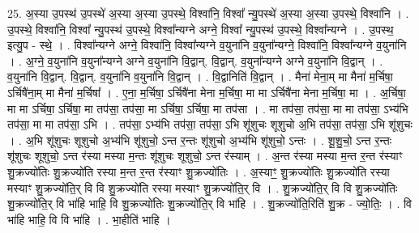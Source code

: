 \documentclass[17pt]{extarticle}
\begin{document}
25. अ॒स्या उ॒पस्थ॑ उ॒पस्थे॑ अ॒स्या अ॒स्या उ॒पस्थे॒ विश्वा॑नि॒ विश्वा᳚ न्यु॒पस्थे॑ अ॒स्या अ॒स्या उ॒पस्थे॒ विश्वा॑नि । . उ॒पस्थे॒ विश्वा॑नि॒ विश्वा᳚ न्यु॒पस्थ॑ उ॒पस्थे॒ विश्वा᳚न्यग्ने अग्ने॒ विश्वा᳚ न्यु॒पस्थ॑ उ॒पस्थे॒ विश्वा᳚न्यग्ने । . उ॒पस्थ॒ इत्यु॒प - स्थे॒ । . विश्वा᳚न्यग्ने अग्ने॒ विश्वा॑नि॒ विश्वा᳚न्यग्ने व॒युना॑नि व॒युना᳚न्यग्ने॒ विश्वा॑नि॒ विश्वा᳚न्यग्ने व॒युना॑नि । . अ॒ग्ने॒ व॒युना॑नि व॒युना᳚न्यग्ने अग्ने व॒युना॑नि वि॒द्वान्. वि॒द्वान्. व॒युना᳚न्यग्ने अग्ने व॒युना॑नि वि॒द्वान् । . व॒युना॑नि वि॒द्वान्. वि॒द्वान्. व॒युना॑नि व॒युना॑नि वि॒द्वान् । . वि॒द्वानिति॑ वि॒द्वान् । . मैना॑ मेना॒म् मा मैना॑ म॒र्चिषा॒ ऽर्चिषै॑ना॒म् मा मैना॑ म॒र्चिषा᳚ । . ए॒ना॒ म॒र्चिषा॒ ऽर्चिषै॑ना मेना म॒र्चिषा॒ मा मा ऽर्चिषै॑ना मेना म॒र्चिषा॒ मा । . अ॒र्चिषा॒ मा मा ऽर्चिषा॒ ऽर्चिषा॒ मा तप॑सा॒ तप॑सा॒ मा ऽर्चिषा॒ ऽर्चिषा॒ मा तप॑सा । . मा तप॑सा॒ तप॑सा॒ मा मा तप॑सा॒ ऽभ्य॑भि तप॑सा॒ मा मा तप॑सा॒ ऽभि । . तप॑सा॒ ऽभ्य॑भि तप॑सा॒ तप॑सा॒ ऽभि शू॑शुचः शूशुचो अ॒भि तप॑सा॒ तप॑सा॒ ऽभि शू॑शुचः । . अ॒भि शू॑शुचः शूशुचो अ॒भ्य॑भि शू॑शुचो॒ ऽन्त र॒न्तः शू॑शुचो अ॒भ्य॑भि शू॑शुचो॒ ऽन्तः । . शू॒शु॒चो॒ ऽन्त र॒न्तः शू॑शुचः शूशुचो॒ ऽन्त र॑स्या मस्या म॒न्तः शू॑शुचः शूशुचो॒ ऽन्त र॑स्याम् । . अ॒न्त र॑स्या मस्या म॒न्त र॒न्त र॑स्याꣳ शु॒क्रज्यो॑तिः शु॒क्रज्यो॑ति रस्या म॒न्त र॒न्त र॑स्याꣳ शु॒क्रज्यो॑तिः । . अ॒स्याꣳ॒॒ शु॒क्रज्यो॑तिः शु॒क्रज्यो॑ति रस्या मस्याꣳ शु॒क्रज्यो॑ति॒र् वि वि शु॒क्रज्यो॑ति रस्या मस्याꣳ शु॒क्रज्यो॑ति॒र् वि । . शु॒क्रज्यो॑ति॒र् वि वि शु॒क्रज्यो॑तिः शु॒क्रज्यो॑ति॒र् वि भा॑हि भाहि॒ वि शु॒क्रज्यो॑तिः शु॒क्रज्यो॑ति॒र् वि भा॑हि । . शु॒क्रज्यो॑ति॒रिति॑ शु॒क्र - ज्यो॒तिः॒ । . वि भा॑हि भाहि॒ वि वि भा॑हि । . भा॒हीति॑ भाहि । \newline
\end{document}
